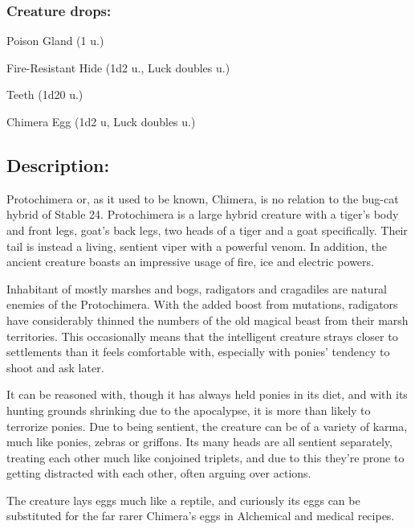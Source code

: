\documentclass[11pt,a4paper,twocolumn]{book}
\begin{document}
		\subsubsection*{Creature drops:}
	\begin{compactitem}
		\item Poison Gland (1 u.)
		\item Fire-Resistant Hide (1d2 u., Luck doubles u.)
		\item Teeth (1d20 u.)
		\item Chimera Egg (1d2 u, Luck doubles u.)
	\end{compactitem}
	
	\subsection*{Description:}
	Protochimera or, as it used to be known, Chimera, is no relation to the bug-cat hybrid of Stable 24. Protochimera is a large hybrid creature with a tiger's body and front legs, goat's back legs, two heads of a tiger and a goat specifically. Their tail is instead a living, sentient viper with a powerful venom. In addition, the ancient creature boasts an impressive usage of fire, ice and electric powers.
	
	\medskip
	
	Inhabitant of mostly marshes and bogs, radigators and cragadiles are natural enemies of the Protochimera. With the added boost from mutations, radigators have considerably thinned the numbers of the old magical beast from their marsh territories. This occasionally means that the intelligent creature strays closer to settlements than it feels comfortable with, especially with ponies' tendency to shoot and ask later.
	
	It can be reasoned with, though it has always held ponies in its diet, and with its hunting grounds shrinking due to the apocalypse, it is more than likely to terrorize ponies. Due to being sentient, the creature can be of a variety of karma, much like ponies, zebras or griffons. Its many heads are all sentient separately, treating each other much like conjoined triplets, and due to this they're prone to getting distracted with each other, often arguing over actions.
	
	\medskip
	
	The creature lays eggs much like a reptile, and curiously its eggs can be substituted for the far rarer Chimera's eggs in Alchemical and medical recipes.

	\clearpage
\end{document}
